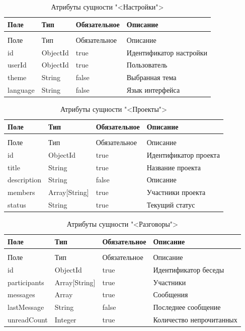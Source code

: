 \begin{xltabular}{\textwidth}{|l|l|p{3.2cm}|X|}
  \caption{Атрибуты сущности "<Настройки">\label{settings:table}}\\ \hline
  Поле & Тип & Обязательное & Описание \\ \hline
  \endfirsthead
  \\ \hline
  Поле & Тип & Обязательное & Описание \\ \hline
  \endhead
  id & ObjectId & true & Идентификатор настройки \\ \hline
  userId & ObjectId & true & Пользователь \\ \hline
  theme & String & false & Выбранная тема \\ \hline
  language & String & false & Язык интерфейса \\ \hline
\end{xltabular}

\begin{xltabular}{\textwidth}{|l|l|p{3.2cm}|X|}
  \caption{Атрибуты сущности "<Проекты">\label{projects:table}}\\ \hline
  Поле & Тип & Обязательное & Описание \\ \hline
  \endfirsthead
  \\ \hline
  Поле & Тип & Обязательное & Описание \\ \hline
  \endhead
  id & ObjectId & true & Идентификатор проекта \\ \hline
  title & String & true & Название проекта \\ \hline
  description & String & false & Описание \\ \hline
  members & Array[String] & true & Участники проекта \\ \hline
  status & String & true & Текущий статус \\ \hline
\end{xltabular}

\begin{xltabular}{\textwidth}{|l|l|p{3.2cm}|X|}
  \caption{Атрибуты сущности "<Разговоры">\label{talks:table}}\\ \hline
  Поле & Тип & Обязательное & Описание \\ \hline
  \endfirsthead
  \\ \hline
  Поле & Тип & Обязательное & Описание \\ \hline
  \endhead
  id & ObjectId & true & Идентификатор беседы \\ \hline
  participants & Array[String] & true & Участники \\ \hline
  messages & Array & true & Сообщения \\ \hline
  lastMessage & String & false & Последнее сообщение \\ \hline
  unreadCount & Integer & true & Количество непрочитанных \\ \hline
\end{xltabular}

